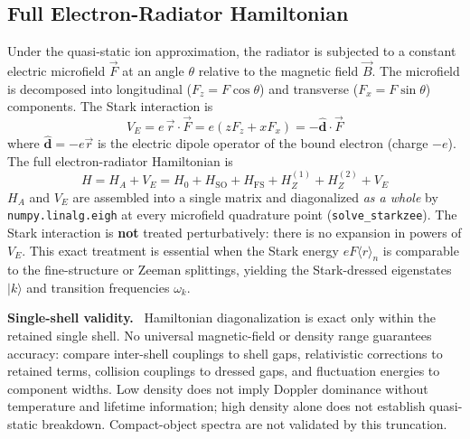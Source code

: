 \documentclass[11pt,a4paper]{article}
\newenvironment{caveat}[1][Caveat]{%
  \par\smallskip\noindent\begin{lrbox}{\notebox}\setlength{\fboxsep}{6pt}\begin{minipage}{\dimexpr\linewidth-2\fboxsep-2\fboxrule\relax}\small\textbf{#1.}\ }{%
  \end{minipage}\end{lrbox}\setlength{\fboxsep}{6pt}\fcolorbox{warnframe}{warnbg}{\usebox{\notebox}}\par\smallskip}
\numberwithin{equation}{section}
\begin{document}
\subsection{Full Electron-Radiator Hamiltonian}
\label{sec:full_hamiltonian}
Under the quasi-static ion approximation, the radiator is subjected to a constant electric microfield $\vec{F}$ at an angle $\theta$ relative to the magnetic field $\vec{B}$. The microfield is decomposed into longitudinal ($F_z = F\cos\theta$) and transverse ($F_x = F\sin\theta$) components. The Stark interaction is
\begin{equation}
V_E = e\,\vec{r}\cdot\vec{F} = e(z F_z + x F_x) = -\hat{\boldsymbol{d}}\cdot\vec{F}
\end{equation}
where $\hat{\boldsymbol{d}} = -e\vec{r}$ is the electric dipole operator of the bound electron (charge $-e$). The full electron-radiator Hamiltonian is
\begin{equation}
\label{eq:full_hamiltonian}
H = H_A + V_E = H_0 + H_\mathrm{SO} + H_\mathrm{FS} + H_Z^{(1)} + H_Z^{(2)} + V_E
\end{equation}
$H_A$ and $V_E$ are assembled into a single matrix and diagonalized \emph{as a whole} by \texttt{numpy.linalg.\allowbreak{}eigh} at every microfield quadrature point (\texttt{solve\_starkzee}). The Stark interaction is \textbf{not} treated perturbatively: there is no expansion in powers of $V_E$. This exact treatment is essential when the Stark energy $eF\langle r\rangle_n$ is comparable to the fine-structure or Zeeman splittings, yielding the Stark-dressed eigenstates $|k\rangle$ and transition frequencies $\omega_k$.

\begin{caveat}[Single-shell validity]
Hamiltonian diagonalization is exact only within the retained single shell.
No universal magnetic-field or density range guarantees accuracy: compare
inter-shell couplings to shell gaps, relativistic corrections to retained terms,
collision couplings to dressed gaps, and fluctuation energies to component widths.
Low density does not imply Doppler dominance without temperature and lifetime
information; high density alone does not establish quasi-static breakdown.
Compact-object spectra are not validated by this truncation.
\end{caveat}
\end{document}
